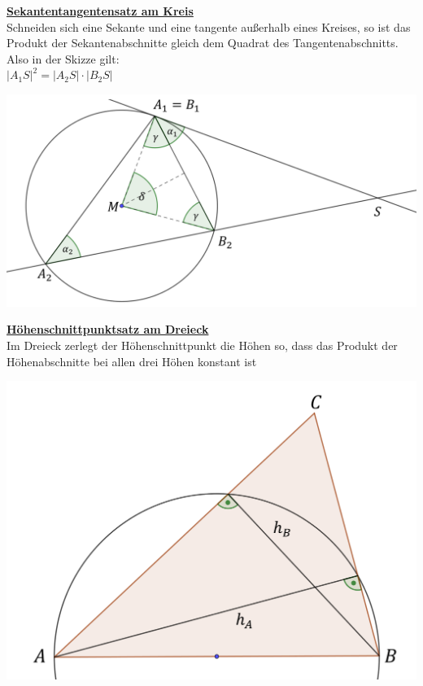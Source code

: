\documentclass[a4paper,headlines=4, footlines=1]{scrartcl}
\begin{document}
\begin{minipage}[b]{0.5\textwidth}
	\underline{\textbf{Sekantentangentensatz am Kreis}}\\ Schneiden sich eine Sekante und eine tangente außerhalb eines Kreises, so ist das Produkt der Sekantenabschnitte gleich dem Quadrat des Tangentenabschnitts. 
	Also in der Skizze gilt:\\$ |A_1S|^2=|A_2S|\cdot|B_2S| $ 	
\end{minipage}
\begin{minipage}{0.5\textwidth}
	\begin{flushright}
		\includegraphics[scale=0.15]{Sehnentangentensatz}
	\end{flushright}		
\end{minipage}
\begin{minipage}[b]{0.5\textwidth}
	\underline{\textbf{Höhenschnittpunktsatz am Dreieck}}\\ Im Dreieck zerlegt der Höhenschnittpunkt die Höhen so, dass das Produkt der Höhenabschnitte bei allen drei Höhen konstant ist
\end{minipage}
\begin{minipage}{0.5\textwidth}
	\begin{flushright}
		\includegraphics[scale=0.17]{Hohenabschnittsatz}
	\end{flushright}		
\end{minipage}
\end{document}
